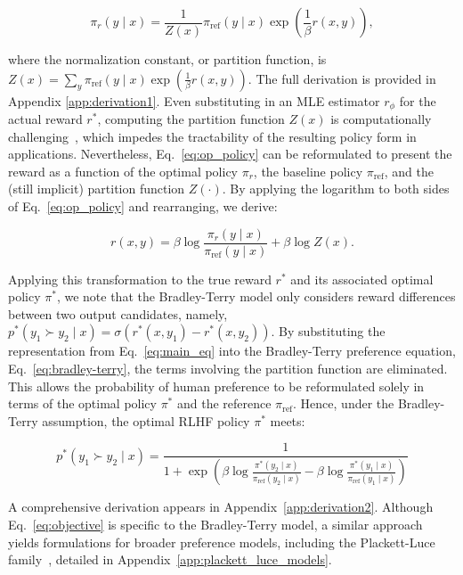 \begin{equation}\label{eq:op_policy}
    \pi_r(y\mid x) = \frac{1}{Z(x)}\pi_\text{ref}(y\mid x)\exp\left(\frac{1}{\beta}r(x, y)\right),
\end{equation}

where the normalization constant, or partition function, is $Z(x) =\sum_{y}\pi_\text{ref}(y\mid x)\exp\left(\frac{1}{\beta}r(x, y)\right)$. The full derivation is provided in Appendix \ref{app:derivation1}. Even substituting in an MLE estimator $r_{\phi}$ for the actual reward $r^*$, computing the partition function $Z(x)$ is computationally challenging~\citep{korbak2022reinforcement, go2023aligning}, which impedes the tractability of the resulting policy form in applications. Nevertheless, Eq.~\ref{eq:op_policy} can be reformulated to present the reward as a function of the optimal policy $\pi_r$, the baseline policy $\pi_\text{ref}$, and the (still implicit) partition function $Z(\cdot)$. By applying the logarithm to both sides of Eq.~\ref{eq:op_policy} and rearranging, we derive:

\begin{equation}\label{eq:main_eq}
    r(x,y) =\beta \log \frac{\pi_r(y\mid x)}{\pi_\text{ref}(y\mid x)} + \beta \log Z(x).
\end{equation}

Applying this transformation to the true reward $r^*$ and its associated optimal policy $\pi^*$, we note that the Bradley-Terry model only considers reward differences between two output candidates, namely, ${p^*(y_1 \succ y_2 \mid x) = \sigma(r^*(x, y_1) - r^*(x, y_2))}$. By substituting the representation from Eq.~\ref{eq:main_eq} into the Bradley-Terry preference equation, Eq.~\ref{eq:bradley-terry}, the terms involving the partition function are eliminated. This allows the probability of human preference to be reformulated solely in terms of the optimal policy $\pi^*$ and the reference $\pi_\text{ref}$. Hence, under the Bradley-Terry assumption, the optimal RLHF policy $\pi^*$ meets:

\begin{equation}\label{eq:objective}
    p^*(y_1\succ y_2 \mid x)=\frac{1}{1 + \exp\left(\beta \log \frac{\pi^*(y_2\mid x)}{\pi_\text{ref}(y_2\mid x)} - \beta \log \frac{\pi^*(y_1\mid x)}{\pi_\text{ref}(y_1\mid x)}\right)}
\end{equation}

A comprehensive derivation appears in Appendix~\ref{app:derivation2}. Although Eq.~\ref{eq:objective} is specific to the Bradley-Terry model, a similar approach yields formulations for broader preference models, including the Plackett-Luce family~\citep{plackett1975analysis, luce2012individual}, detailed in Appendix~\ref{app:plackett_luce_models}.

